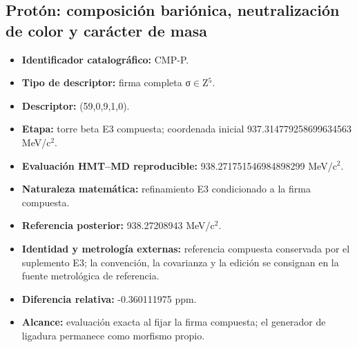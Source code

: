 \subsection{Protón: composición bariónica, neutralización de color y carácter de masa}
\begin{itemize}
\item \textbf{Identificador catalográfico:} CMP-P.
\item \textbf{Tipo de descriptor:} firma completa σ\(\in\)Z\({}^{5}\).
\item \textbf{Descriptor:} (59,0,9,1,0).
\item \textbf{Etapa:} torre beta E3 compuesta; coordenada inicial 937.314779\allowbreak{}258699\allowbreak{}634563 MeV/c\({}^{2}\).
\item \textbf{Evaluación HMT--MD reproducible:} 938.271751\allowbreak{}546984\allowbreak{}898299 MeV/c\({}^{2}\).
\item \textbf{Naturaleza matemática:} refinamiento E3 condicionado a la firma compuesta.
\item \textbf{Referencia posterior:} 938.272089\allowbreak{}43 MeV/c\({}^{2}\).
\item \textbf{Identidad y metrología externas:} referencia compuesta conservada por el suplemento E3; la convención, la covarianza y la edición se consignan en la fuente metrológica de referencia.
\item \textbf{Diferencia relativa:} -0.360111\allowbreak{}975 ppm.
\item \textbf{Alcance:} evaluación exacta al fijar la firma compuesta; el generador de ligadura permanece como morfismo propio.
\end{itemize}
